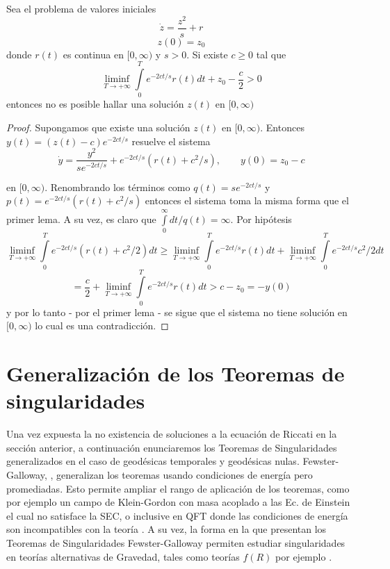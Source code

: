 \begin{lemma}\label{lema Riccati 3}
Sea el problema de valores iniciales 
$$
\dot{z}=\frac{z^2}{s} + r
$$
$$
z(0)=z_0
$$
donde $r(t)$ es continua en $[0,\infty)$ y $s>0$. Si existe $c\geq 0$ tal que 
$$
\liminf_{T\to +\infty}\int\limits_0^T e^{-2ct/s}r(t)dt + z_0 - \frac{c}{2}>0
$$
entonces no es posible hallar una solución $z(t)$ en $[0,\infty)$ 
\end{lemma}
\begin{proof}
Supongamos que existe una solución $z(t)$ en $[0,\infty)$. Entonces $y(t)=(z(t)-c)e^{-2ct/s}$ resuelve el sistema
$$
\dot{y}=\frac{y^2}{s e^{-2ct/s}}+e^{-2ct/s}(r(t)+c^2/s), \qquad y(0)=z_0-c
$$

en $[0,\infty)$. Renombrando los términos como $q(t)=s e^{-2ct/s}$ y $p(t)=e^{-2ct/s}(r(t)+c^2/s)$ entonces el sistema toma la misma
forma que el primer lema. A su vez, es claro que $\int\limits_0^\infty dt/q(t)=\infty$. Por hipótesis 
$$
\liminf_{T\to +\infty}\int\limits_0^T e^{-2ct/s}(r(t)+c^2/2)dt\geq \liminf_{T\to +\infty}\int\limits_0^T e^{-2ct/s}r(t)dt + 
\liminf_{T\to +\infty}\int\limits_0^T e^{-2ct/s}c^2/2dt
$$
$$
=\frac{c}{2}+\liminf_{T\to +\infty}\int\limits_0^T e^{-2ct/s}r(t)dt > c-z_0=-y(0)
$$
y por lo tanto - por el primer lema - se sigue que el sistema no tiene solución en $[0,\infty)$ lo cual es una contradicción.
\end{proof}









\section{Generalización de los Teoremas de singularidades} 




Una vez expuesta la no existencia de soluciones a la ecuación de Riccati en la sección anterior, a continuación enunciaremos los Teoremas de Singularidades generalizados en el caso de geodésicas temporales y geodésicas nulas. Fewster-Galloway, \citep{2011CQGra..28l5009F}, generalizan los teoremas usando condiciones de energía pero promediadas. Esto permite ampliar el rango de aplicación de los teoremas, como por ejemplo un campo de Klein-Gordon con masa acoplado a las Ec. de Einstein el cual no satisface la SEC, o inclusive en QFT donde las condiciones de energía son incompatibles con la teoría \citep{1965NCim...36.1016E}. A su vez, la forma en la que presentan los Teoremas de Singularidades Fewster-Galloway permiten estudiar singularidades en teorías alternativas de Gravedad, tales como teorías $f(R)$ por ejemplo \citep{2016JCAP...05..023A}. 

